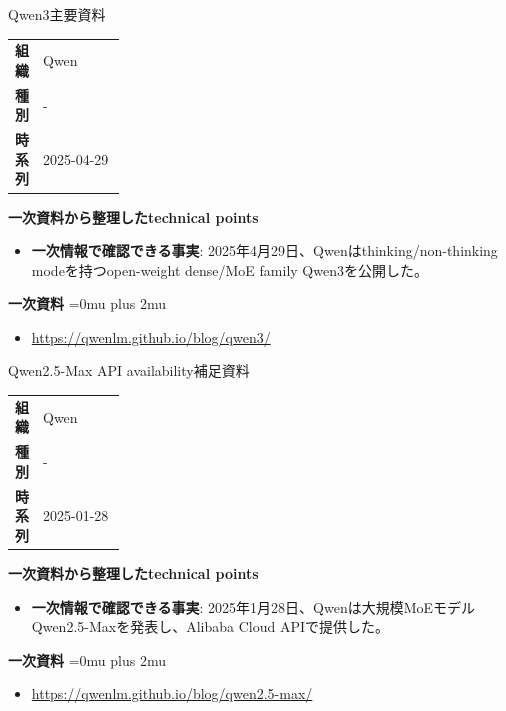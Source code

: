 \begin{technicalnote}{Qwen3}{主要資料}
\begingroup
\begin{tabularx}{\linewidth}{@{}>{\bfseries}p{0.22\linewidth}X@{}}
組織 & Qwen \\
種別 & - \\
時系列 & 2025-04-29 \\
\end{tabularx}
\smallskip
{\bfseries 一次資料から整理したtechnical points}
\begin{itemize}[leftmargin=1.5em,itemsep=0.35em]
\item \textbf{一次情報で確認できる事実}: 2025年4月29日、Qwenはthinking/non-thinking modeを持つopen-weight dense/MoE family Qwen3を公開した。
\end{itemize}
\begin{samepage}
{\bfseries 一次資料}
\begingroup\sloppy
\Urlmuskip=0mu plus 2mu\relax
\begin{itemize}[leftmargin=1.5em,itemsep=0.25em]
\item {\scriptsize\url{https://qwenlm.github.io/blog/qwen3/}}
\end{itemize}
\endgroup
\end{samepage}
\endgroup
\end{technicalnote}
\medskip

\begin{technicalnote}{Qwen2.5-Max API availability}{補足資料}
\begingroup
\begin{tabularx}{\linewidth}{@{}>{\bfseries}p{0.22\linewidth}X@{}}
組織 & Qwen \\
種別 & - \\
時系列 & 2025-01-28 \\
\end{tabularx}
\smallskip
{\bfseries 一次資料から整理したtechnical points}
\begin{itemize}[leftmargin=1.5em,itemsep=0.35em]
\item \textbf{一次情報で確認できる事実}: 2025年1月28日、Qwenは大規模MoEモデルQwen2.5-Maxを発表し、Alibaba Cloud APIで提供した。
\end{itemize}
\begin{samepage}
{\bfseries 一次資料}
\begingroup\sloppy
\Urlmuskip=0mu plus 2mu\relax
\begin{itemize}[leftmargin=1.5em,itemsep=0.25em]
\item {\scriptsize\url{https://qwenlm.github.io/blog/qwen2.5-max/}}
\end{itemize}
\endgroup
\end{samepage}
\endgroup
\end{technicalnote}
\medskip

